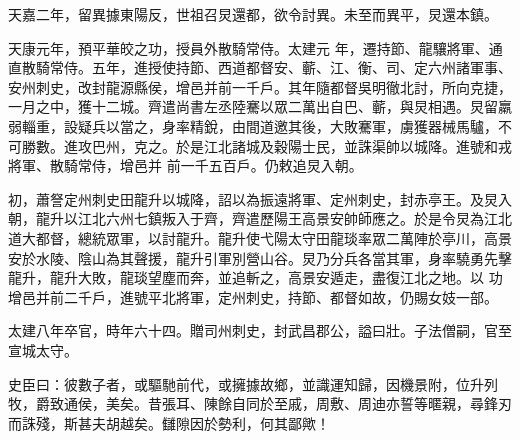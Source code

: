 \begin{pinyinscope}
 天嘉二年，留異據東陽反，世祖召炅還都，欲令討異。未至而異平，炅還本鎮。



 天康元年，預平華皎之功，授員外散騎常侍。太建元
 年，遷持節、龍驤將軍、通直散騎常侍。五年，進授使持節、西道都督安、蘄、江、衡、司、定六州諸軍事、安州刺史，改封龍源縣侯，增邑并前一千戶。其年隨都督吳明徹北討，所向克捷，一月之中，獲十二城。齊遣尚書左丞陸騫以眾二萬出自巴、蘄，與炅相遇。炅留羸弱輜重，設疑兵以當之，身率精銳，由間道邀其後，大敗騫軍，虜獲器械馬驢，不可勝數。進攻巴州，克之。於是江北諸城及穀陽士民，並誅渠帥以城降。進號和戎將軍、散騎常侍，增邑并
 前一千五百戶。仍敕追炅入朝。



 初，蕭詧定州刺史田龍升以城降，詔以為振遠將軍、定州刺史，封赤亭王。及炅入朝，龍升以江北六州七鎮叛入于齊，齊遣歷陽王高景安帥師應之。於是令炅為江北道大都督，總統眾軍，以討龍升。龍升使弋陽太守田龍琰率眾二萬陣於亭川，高景安於水陵、陰山為其聲援，龍升引軍別營山谷。炅乃分兵各當其軍，身率驍勇先擊龍升，龍升大敗，龍琰望塵而奔，並追斬之，高景安遁走，盡復江北之地。以
 功增邑并前二千戶，進號平北將軍，定州刺史，持節、都督如故，仍賜女妓一部。



 太建八年卒官，時年六十四。贈司州刺史，封武昌郡公，謚曰壯。子法僧嗣，官至宣城太守。



 史臣曰：彼數子者，或驅馳前代，或擁據故鄉，並識運知歸，因機景附，位升列牧，爵致通侯，美矣。昔張耳、陳餘自同於至戚，周敷、周迪亦誓等暱親，尋鋒刃而誅殘，斯甚夫胡越矣。讎隙因於勢利，何其鄙歟！



\end{pinyinscope}